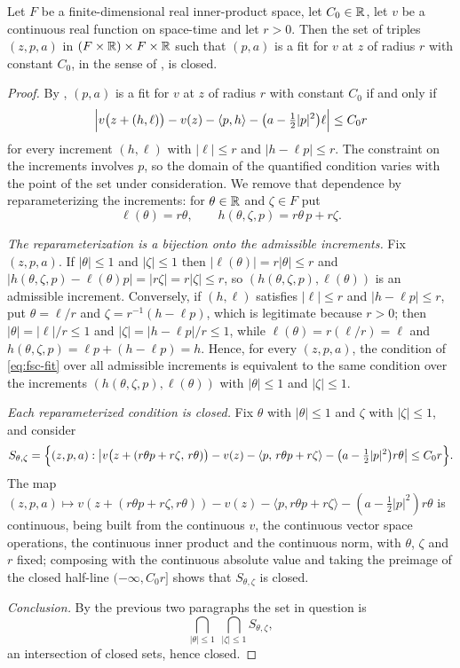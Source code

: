 \begin{helper}
Let $F$ be a finite-dimensional real inner-product space, let $C_0\in\mathbb{R}$, let
$v$ be a continuous real function on space-time and let $r>0$. Then the set of
triples $(z,p,a)$ in $(F\times\mathbb{R})\times F\times\mathbb{R}$ such that $(p,a)$ is a fit
for $v$ at $z$ of radius $r$ with constant $C_0$, in the sense of
, is closed.
\end{helper}
\begin{proof}
By , $(p,a)$ is a fit for $v$ at $z$ of radius $r$ with constant
$C_0$ if and only if
\begin{equation}\label{eq:fsc-fit}
  \Bigl|v\bigl(z+(h,\ell)\bigr)-v(z)-\langle p,h\rangle
     -\bigl(a-\tfrac12|p|^2\bigr)\ell\Bigr|\le C_0r
\end{equation}
for every increment $(h,\ell)$ with $|\ell|\le r$ and $|h-\ell p|\le r$. The
constraint on the increments involves $p$, so the domain of the quantified
condition varies with the point of the set under consideration. We remove that
dependence by reparameterizing the increments: for $\theta\in\mathbb{R}$ and $\zeta\in F$
put
\[
  \ell(\theta)=r\theta,\qquad h(\theta,\zeta,p)=r\theta\,p+r\zeta .
\]

\emph{The reparameterization is a bijection onto the admissible increments.}
Fix $(z,p,a)$. If $|\theta|\le1$ and $|\zeta|\le1$ then
$|\ell(\theta)|=r|\theta|\le r$ and
$|h(\theta,\zeta,p)-\ell(\theta)p|=|r\zeta|=r|\zeta|\le r$, so
$(h(\theta,\zeta,p),\ell(\theta))$ is an admissible increment. Conversely, if
$(h,\ell)$ satisfies $|\ell|\le r$ and $|h-\ell p|\le r$, put
$\theta=\ell/r$ and $\zeta=r^{-1}(h-\ell p)$, which is legitimate because
$r>0$; then $|\theta|=|\ell|/r\le1$ and $|\zeta|=|h-\ell p|/r\le1$, while
$\ell(\theta)=r(\ell/r)=\ell$ and
$h(\theta,\zeta,p)=\ell p+(h-\ell p)=h$. Hence, for every $(z,p,a)$, the
condition of \eqref{eq:fsc-fit} over all admissible increments is equivalent to
the same condition over the increments $(h(\theta,\zeta,p),\ell(\theta))$ with
$|\theta|\le1$ and $|\zeta|\le1$.

\emph{Each reparameterized condition is closed.} Fix $\theta$ with
$|\theta|\le1$ and $\zeta$ with $|\zeta|\le1$, and consider
\[
  S_{\theta,\zeta}=\Bigl\{(z,p,a):\bigl|v\bigl(z+(r\theta p+r\zeta,\,r\theta)\bigr)
    -v(z)-\langle p,\,r\theta p+r\zeta\rangle
    -\bigl(a-\tfrac12|p|^2\bigr)r\theta\bigr|\le C_0r\Bigr\}.
\]
The map
$(z,p,a)\mapsto v(z+(r\theta p+r\zeta,r\theta))-v(z)-\langle p,r\theta p+r\zeta\rangle
 -(a-\tfrac12|p|^2)r\theta$
is continuous, being built from the continuous $v$, the continuous vector space
operations, the continuous inner product and the continuous norm, with
$\theta$, $\zeta$ and $r$ fixed; composing with the continuous absolute value
and taking the preimage of the closed half-line $(-\infty,C_0r]$ shows that
$S_{\theta,\zeta}$ is closed.

\emph{Conclusion.} By the previous two paragraphs the set in question is
\[
  \bigcap_{|\theta|\le1}\ \bigcap_{|\zeta|\le1}S_{\theta,\zeta},
\]
an intersection of closed sets, hence closed. \end{proof}
